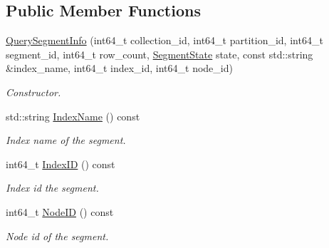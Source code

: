 \subsection*{Public Member Functions}
\begin{DoxyCompactItemize}
\item 
\mbox{\label{classmilvus_1_1_query_segment_info_a9f223b1e79cd116f05b7057de7d916b8}} 
\hyperlink{classmilvus_1_1_query_segment_info_a9f223b1e79cd116f05b7057de7d916b8}{Query\+Segment\+Info} (int64\+\_\+t collection\+\_\+id, int64\+\_\+t partition\+\_\+id, int64\+\_\+t segment\+\_\+id, int64\+\_\+t row\+\_\+count, \hyperlink{namespacemilvus_abe8ed76f6dc4b1b12a59f67fcef5afed}{Segment\+State} state, const std\+::string \&index\+\_\+name, int64\+\_\+t index\+\_\+id, int64\+\_\+t node\+\_\+id)
\begin{DoxyCompactList}\small\item\em Constructor. \end{DoxyCompactList}\item 
\mbox{\label{classmilvus_1_1_query_segment_info_af3d8c5bdbe58421216e34d929fb8664f}} 
std\+::string \hyperlink{classmilvus_1_1_query_segment_info_af3d8c5bdbe58421216e34d929fb8664f}{Index\+Name} () const
\begin{DoxyCompactList}\small\item\em Index name of the segment. \end{DoxyCompactList}\item 
\mbox{\label{classmilvus_1_1_query_segment_info_a2e6a6bb0f808f8ec98c1b1dc9e79e7b1}} 
int64\+\_\+t \hyperlink{classmilvus_1_1_query_segment_info_a2e6a6bb0f808f8ec98c1b1dc9e79e7b1}{Index\+ID} () const
\begin{DoxyCompactList}\small\item\em Index id the segment. \end{DoxyCompactList}\item 
\mbox{\label{classmilvus_1_1_query_segment_info_a35c405ba48db8b6c05a10fabe3ad306d}} 
int64\+\_\+t \hyperlink{classmilvus_1_1_query_segment_info_a35c405ba48db8b6c05a10fabe3ad306d}{Node\+ID} () const
\begin{DoxyCompactList}\small\item\em Node id of the segment. \end{DoxyCompactList}\end{DoxyCompactItemize}


